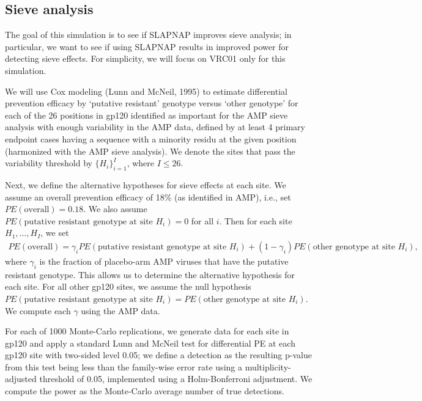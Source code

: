 \documentclass[10pt]{article}
\begin{document}
\subsection{Sieve analysis}

The goal of this simulation is to see if SLAPNAP improves sieve analysis; in particular, we want to see if using SLAPNAP results in improved power for detecting sieve effects. For simplicity, we will focus on VRC01 only for this simulation.

We will use Cox modeling (Lunn and McNeil, 1995) to estimate differential prevention efficacy by `putative resistant' genotype versus `other genotype' for each of the 26 positions in gp120 identified as important for the AMP sieve analysis with enough variability in the AMP data, defined by at least 4 primary endpoint cases having a sequence with a minority residu at the given position (harmonized with the AMP sieve analysis). We denote the sites that pass the variability threshold by $\{H_i\}_{i=1}^I$, where $I \leq 26$.

Next, we define the alternative hypotheses for sieve effects at each site. We assume an overall prevention efficacy of 18\% (as identified in AMP), i.e., set $PE(\text{overall}) = 0.18$. We also assume $PE(\text{putative resistant genotype at site } H_i) = 0$ for all $i$. Then for each site $H_1,\ldots,H_I$, we set
\begin{align*}
    PE(\text{overall}) = \gamma_i PE(\text{putative resistant genotype at site } H_i) + (1 - \gamma_i)PE(\text{other genotype at site } H_i),
\end{align*}
where $\gamma_i$ is the fraction of placebo-arm AMP viruses that have the putative resistant genotype. This allows us to determine the alternative hypothesis for each site. For all other gp120 sites, we assume the null hypothesis $PE(\text{putative resistant genotype at site } H_i) = PE(\text{other genotype at site } H_i)$. We compute each $\gamma$ using the AMP data.

For each of 1000 Monte-Carlo replications, we generate data for each site in gp120 and apply a standard Lunn and McNeil test for differential PE at each gp120 site with two-sided level 0.05; we define a detection as the resulting p-value from this test being less than the family-wise error rate using a multiplicity-adjusted threshold of 0.05, implemented using a Holm-Bonferroni adjustment. We compute the power as the Monte-Carlo average number of true detections.
\end{document}
